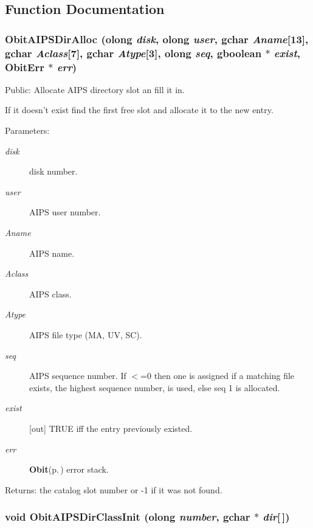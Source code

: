 \subsection{Function Documentation}
\subsubsection{ Obit\-AIPSDir\-Alloc ({\bf olong} {\em disk}, {\bf olong} {\em user}, gchar {\em Aname}[13], gchar {\em Aclass}[7], gchar {\em Atype}[3], {\bf olong} {\em seq}, gboolean $\ast$ {\em exist}, {\bf Obit\-Err} $\ast$ {\em err})}\label{ObitAIPSDir_8c_a20}


Public: Allocate AIPS directory slot an fill it in. 

If it doesn't exist find the first free slot and allocate it to the new entry. \begin{Desc}
\item[Parameters:]
\begin{description}
\item[{\em disk}]disk number. \item[{\em user}]AIPS user number. \item[{\em Aname}]AIPS name. \item[{\em Aclass}]AIPS class. \item[{\em Atype}]AIPS file type (MA, UV, SC). \item[{\em seq}]AIPS sequence number. If $<$=0 then one is assigned if a matching file exists, the highest sequence number, is used, else seq 1 is allocated. \item[{\em exist}][out] TRUE iff the entry previously existed. \item[{\em err}]{\bf Obit}{\rm (p.\,\pageref{structObit})} error stack. \end{description}
\end{Desc}
\begin{Desc}
\item[Returns:]the catalog slot number or -1 if it was not found. \end{Desc}
\subsubsection{\setlength{\rightskip}{0pt plus 5cm}void Obit\-AIPSDir\-Class\-Init ({\bf olong} {\em number}, gchar $\ast$ {\em dir}[$\,$])}\label{ObitAIPSDir_8c_a18}


